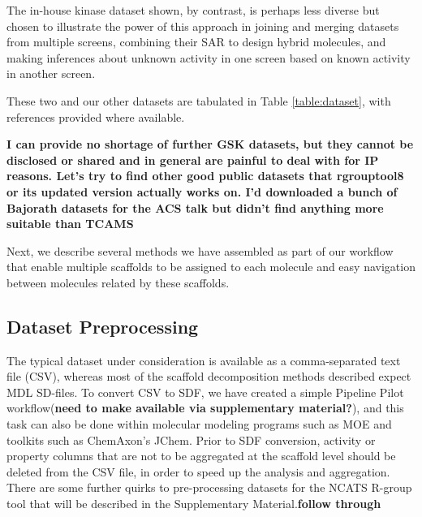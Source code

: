 \documentclass[journal=jacsat,manuscript=article]{achemso}
\newcommand*\tref[1]{Table \ref{table:#1}}
\begin{document}
The in-house kinase dataset shown, by contrast, is perhaps less diverse but chosen to illustrate the power of this approach in joining and merging datasets from multiple screens, combining their SAR to design hybrid molecules, and making inferences about unknown activity in one screen based on known activity in another screen.

These two and our other datasets are tabulated in \tref{dataset}, with references provided where available.

\textbf{I can provide no shortage of further GSK datasets, but they cannot be disclosed or shared and in general are painful to deal with for IP reasons. Let's try to find other good public datasets that rgrouptool8 or its updated version actually works on. I'd downloaded a bunch of Bajorath datasets for the ACS talk but didn't find anything more suitable than TCAMS}

Next, we describe several methods we have assembled as part of our workflow that enable multiple scaffolds to be assigned to each molecule and easy navigation between molecules related by these scaffolds. 


\subsection{Dataset Preprocessing}
\label{sec:prepro}
The typical dataset under consideration is available as a comma-separated text file (CSV), whereas most of the scaffold decomposition methods described expect MDL SD-files. To convert CSV to SDF, we have created a simple Pipeline Pilot workflow(\textbf{need to make available via supplementary material?}), and this task can also be done within molecular modeling programs such as MOE and toolkits such as ChemAxon's {JChem}.  Prior to SDF conversion, activity or property columns that are not to be aggregated at the scaffold level should be deleted from the CSV file, in order to speed up the analysis and aggregation.  There are some further quirks to pre-processing datasets for the NCATS R-group tool that will be described in the Supplementary Material.\textbf{follow through}  
\end{document}
